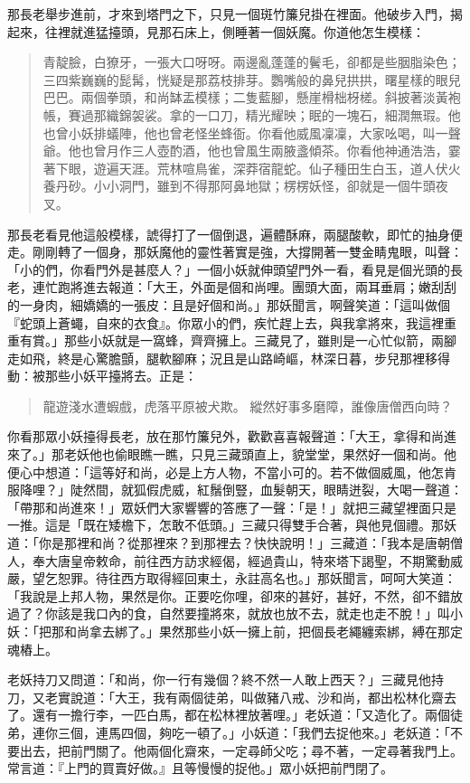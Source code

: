 那長老舉步進前，才來到塔門之下，只見一個斑竹簾兒掛在裡面。他破步入門，揭起來，往裡就進猛擡頭，見那石床上，側睡著一個妖魔。你道他怎生模樣：
\begin{quote}
青靛臉，白獠牙，一張大口呀呀。兩邊亂蓬蓬的鬢毛，卻都是些胭脂染色；三四紫巍巍的髭髯，恍疑是那荔枝排芽。鸚嘴般的鼻兒拱拱，曙星樣的眼兒巴巴。兩個拳頭，和尚缽盂模樣；二隻藍腳，懸崖榾柮枒槎。斜披著淡黃袍帳，賽過那織錦袈裟。拿的一口刀，精光耀映；眠的一塊石，細潤無瑕。他也曾小妖排蟻陣，他也曾老怪坐蜂衙。你看他威風凜凜，大家吆喝，叫一聲爺。他也曾月作三人壺酌酒，他也曾風生兩腋盞傾茶。你看他神通浩浩，霎著下眼，遊遍天涯。荒林喧鳥雀，深莽宿龍蛇。仙子種田生白玉，道人伏火養丹砂。小小洞門，雖到不得那阿鼻地獄；楞楞妖怪，卻就是一個牛頭夜叉。
\end{quote}

那長老看見他這般模樣，諕得打了一個倒退，遍體酥麻，兩腿酸軟，即忙的抽身便走。剛剛轉了一個身，那妖魔他的靈性著實是強，大撐開著一雙金睛鬼眼，叫聲：「小的們，你看門外是甚麼人？」一個小妖就伸頭望門外一看，看見是個光頭的長老，連忙跑將進去報道：「大王，外面是個和尚哩。團頭大面，兩耳垂肩；嫩刮刮的一身肉，細嬌嬌的一張皮：且是好個和尚。」那妖聞言，啊聲笑道：「這叫做個『蛇頭上蒼蠅，自來的衣食』。你眾小的們，疾忙趕上去，與我拿將來，我這裡重重有賞。」那些小妖就是一窩蜂，齊齊擁上。三藏見了，雖則是一心忙似箭，兩腳走如飛，終是心驚膽顫，腿軟腳麻；況且是山路崎嶇，林深日暮，步兒那裡移得動：被那些小妖平擡將去。正是：
\begin{quote}
龍遊淺水遭蝦戲，虎落平原被犬欺。
縱然好事多磨障，誰像唐僧西向時？
\end{quote}

你看那眾小妖擡得長老，放在那竹簾兒外，歡歡喜喜報聲道：「大王，拿得和尚進來了。」那老妖他也偷眼瞧一瞧，只見三藏頭直上，貌堂堂，果然好一個和尚。他便心中想道：「這等好和尚，必是上方人物，不當小可的。若不做個威風，他怎肯服降哩？」陡然間，就狐假虎威，紅鬚倒豎，血髮朝天，眼睛迸裂，大喝一聲道：「帶那和尚進來！」眾妖們大家響響的答應了一聲：「是！」就把三藏望裡面只是一推。這是「既在矮檐下，怎敢不低頭。」三藏只得雙手合著，與他見個禮。那妖道：「你是那裡和尚？從那裡來？到那裡去？快快說明！」三藏道：「我本是唐朝僧人，奉大唐皇帝敕命，前往西方訪求經偈，經過貴山，特來塔下謁聖，不期驚動威嚴，望乞恕罪。待往西方取得經回東土，永註高名也。」那妖聞言，呵呵大笑道：「我說是上邦人物，果然是你。正要吃你哩，卻來的甚好，甚好，不然，卻不錯放過了？你該是我口內的食，自然要撞將來，就放也放不去，就走也走不脫！」叫小妖：「把那和尚拿去綁了。」果然那些小妖一擁上前，把個長老繩纏索綁，縛在那定魂樁上。

老妖持刀又問道：「和尚，你一行有幾個？終不然一人敢上西天？」三藏見他持刀，又老實說道：「大王，我有兩個徒弟，叫做豬八戒、沙和尚，都出松林化齋去了。還有一擔行李，一匹白馬，都在松林裡放著哩。」老妖道：「又造化了。兩個徒弟，連你三個，連馬四個，夠吃一頓了。」小妖道：「我們去捉他來。」老妖道：「不要出去，把前門關了。他兩個化齋來，一定尋師父吃；尋不著，一定尋著我門上。常言道：『上門的買賣好做。』且等慢慢的捉他。」眾小妖把前門閉了。

